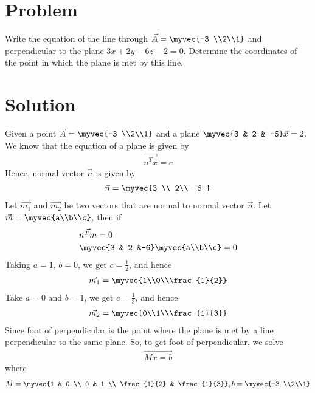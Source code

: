 \documentclass[journal,12pt,twocolumn]{IEEEtran}
\begin{document}
\section{Problem}
Write the equation of the line through $\vec{A} = \myvec{-3 \\2\\1}$ and perpendicular to the plane $3x+2y-6z-2=0$. Determine the coordinates of the point in which the plane is met by this line.   
\section{Solution}
Given a point $\vec{A} = \myvec{-3 \\2\\1}$  and a plane $\myvec{3 & 2 & -6}\vec{x}=2$. We know that the equation of a plane is given by
\begin{align}
	\vec{n^Tx}= c
\end{align}
Hence, normal vector $\vec{n}$ is given by
\begin{align}
	\vec{n} = \myvec{3 \\ 2\\ -6 }
\end{align}
Let $\vec{m_1}$ and $\vec{m_2}$ be two vectors that are normal to normal vector $\vec{n}$.
Let $\vec{m}= \myvec{a\\b\\c}$, then if
\begin{align}
& \vec{n^Tm}= 0 \\
& \myvec{3 & 2 &-6}\myvec{a\\b\\c} = 0
\end{align}
Taking $a =1$, $b=0$, we get $c=\frac{1}{2}$, and hence
\begin{align}
	\vec{m_1}= \myvec{1\\0\\\frac{1}{2}}
\end{align}
Take $a=0$ and $b=1$, we get $c=\frac{1}{3}$, and hence
\begin{align}
	\vec{m_2}= \myvec{0\\1\\\frac{1}{3}}
\end{align}
Since  foot of perpendicular is the point where the plane is met by a line perpendicular to the same plane. So, to get foot of perpendicular, we solve
\begin{align}
\vec{Mx=b} \label{1}
\end{align}
where
\begin{align}
\vec{M} = \myvec{1 & 0 \\ 0 & 1 \\ \frac{1}{2} & \frac{1}{3}},b = \myvec{-3 \\2\\1}\label{2}	
\end{align}
\end{document}
